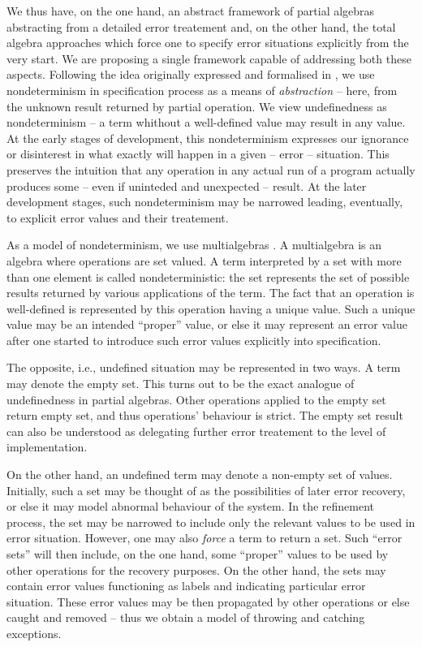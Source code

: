 \documentclass[10pt]{article}
\begin{document}
We thus have, on the one hand, an abstract framework of partial algebras
abstracting from a detailed error treatement and,
on the other hand, the total algebra approaches which force one to specify
error situations explicitly from the very start.
We are proposing a single framework capable of addressing both these
aspects. Following the idea originally expressed and formalised in \cite{calc},
we use nondeterminism in specification process as a means of {\em
abstraction} -- here, from the unknown result returned by partial operation.
We view undefinedness as nondeterminism -- a term whithout a
well-defined value may result in any value. At the early stages of
development, this nondeterminism expresses our ignorance or disinterest in
what exactly will happen in a given -- error -- situation. This preserves
the intuition that any operation in any actual run of a program actually
produces some -- even if uninteded and unexpected -- result. At the later development
stages, such nondeterminism may be narrowed leading, eventually, to explicit
error values and their treatement.

As a model of nondeterminism, we use multialgebras \cite{calc,multi}.
A multialgebra is an algebra where operations are set valued. A term
interpreted by a set with more than one element is called nondeterministic:
the set represents the set of possible results returned by various
applications of the term. 
The fact that an operation is well-defined is represented by this operation
having a unique value. Such a unique value may be an intended ``proper''
value, or else it may represent an error value after one started to introduce
such error values explicitly into specification.

The opposite, i.e., undefined situation may be represented in two ways. A
term may denote the empty set. This turns out to be the exact analogue of
undefinedness in partial algebras. Other operations applied to the empty set
return empty set, and thus operations' behaviour is strict. The empty set
result can also
be understood as delegating further error treatement to the level of
implementation. 

On the other hand, an undefined term may denote a non-empty set of
values. Initially, such a set may be thought of as the possibilities of later
error recovery, or else it may model abnormal behaviour of the system. In the
refinement process, the set may be narrowed to include only the relevant
values to be used in error situation. However, one may also {\em force} a
term to return a set. Such ``error sets'' will then include, on the one hand,
some ``proper'' values to be used by other operations for the recovery
purposes. On the other hand, the sets may contain error values functioning as
labels and indicating particular error situation. These error values may be
then propagated by other operations or else caught and removed -- thus we
obtain a model of throwing and catching exceptions.
\end{document}
